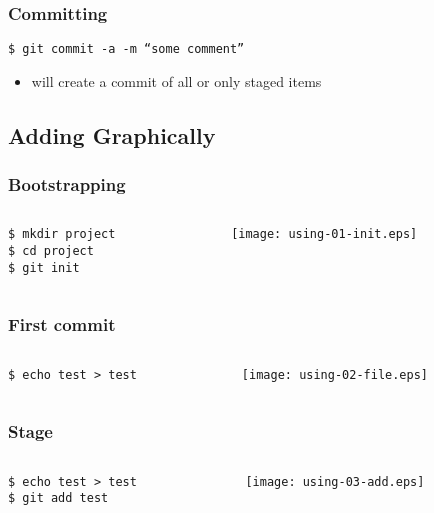 \documentclass[english]{beamer}
\newcommand{\mysubsection}[2]{%
  \hypertarget{#2}{}%
  \subsection{#1}%
  \label{#2}%
}
\newcommand{\CMD}[1]{%
\texttt{\textcolor{code-green}{#1}}%
}
\newcommand{\cmd}[1]{%
\texttt{\textcolor{code-orange}{#1}}%
}
\newcommand{\fnt}[1]{%
\texttt{\textcolor{code-gray}{#1}}%
}
\newcommand{\faint}[1]{%
\textcolor{code-gray}{#1}%
}
\begin{document}
\begin{frame}
\frametitle{Committing}

\CMD{\$ git commit \fnt{-a} -m ``some comment''} \\
\begin{itemize}
        \item will create a commit of \faint{all or} only staged items
\end{itemize}
\end{frame}

\mysubsection{Adding Graphically}{using:addinggrapically}
\begin{frame}
\frametitle{Bootstrapping}

\begin{columns}[t]
        \begin{column}[T]{.5\textwidth}
                \cmd{\$ mkdir project} \\
                \cmd{\$ cd project} \\
                \CMD{\$ git init}
        \end{column}
        \begin{column}[T]{.5\textwidth}
                \texttt{[image: using-01-init.eps]}
        \end{column}
\end{columns}
\end{frame}

\begin{frame}
\frametitle{First commit}
\begin{columns}[t]
        \begin{column}[T]{.5\textwidth}
                \cmd{\$ echo test > test}
        \end{column}
        \begin{column}[T]{.5\textwidth}
                \texttt{[image: using-02-file.eps]}
        \end{column}
\end{columns}
\end{frame}

\begin{frame}
\frametitle{Stage}
\begin{columns}[t]
        \begin{column}[T]{.5\textwidth}
                \cmd{\$ echo test > test} \\
                \CMD{\$ git add test}
        \end{column}
        \begin{column}[T]{.5\textwidth}
                \texttt{[image: using-03-add.eps]}
        \end{column}
\end{columns}
\end{frame}
\end{document}
